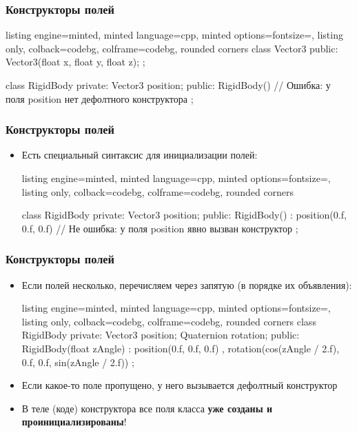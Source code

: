 \documentclass[10pt]{beamer}
\begin{document}
\begin{frame}[fragile]
\frametitle{Конструкторы полей}
\begin{itemize}
\begin{tcblisting}{listing engine=minted, minted language=cpp, minted options={fontsize=\scriptsize}, listing only, colback=codebg, colframe=codebg, rounded corners}
class Vector3 {
public:
  Vector3(float x, float y, float z);
};

class RigidBody {
private:
  Vector3 position;
public:
  RigidBody() {
    // Ошибка: у поля position нет дефолтного конструктора
  }
};
\end{tcblisting}
\end{itemize}
\end{frame}

\begin{frame}[fragile]
\frametitle{Конструкторы полей}
\begin{itemize}
\item Есть специальный синтаксис для инициализации полей:
\begin{tcblisting}{listing engine=minted, minted language=cpp, minted options={fontsize=\scriptsize}, listing only, colback=codebg, colframe=codebg, rounded corners}

class RigidBody {
private:
  Vector3 position;
public:
  RigidBody() : position(0.f, 0.f, 0.f) {
    // Не ошибка: у поля position явно вызван конструктор
  }
};
\end{tcblisting}
\end{itemize}
\end{frame}

\begin{frame}[fragile]
\frametitle{Конструкторы полей}
\begin{itemize}
\item Если полей несколько, перечисляем через запятую (в порядке их объявления):
\begin{tcblisting}{listing engine=minted, minted language=cpp, minted options={fontsize=\scriptsize}, listing only, colback=codebg, colframe=codebg, rounded corners}
class RigidBody {
private:
  Vector3 position;
  Quaternion rotation;
public:
  RigidBody(float zAngle)
    : position(0.f, 0.f, 0.f)
    , rotation(cos(zAngle / 2.f), 0.f, 0.f, sin(zAngle / 2.f))
  {}
};
\end{tcblisting}
\pause
\item Если какое-то поле пропущено, у него вызывается дефолтный конструктор
\pause
\item В теле (коде) конструктора все поля класса \textbf{уже созданы и проинициализированы}!
\end{itemize}
\end{frame}
\end{document}

